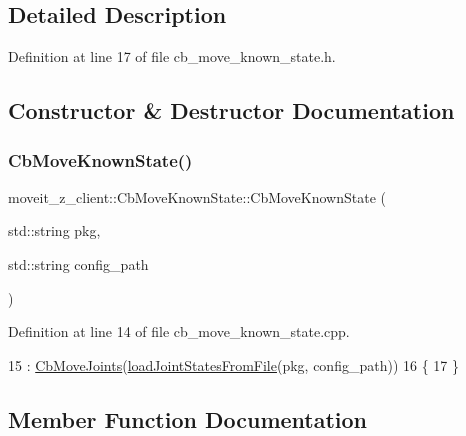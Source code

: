 \subsection{Detailed Description}


Definition at line 17 of file cb\+\_\+move\+\_\+known\+\_\+state.\+h.



\subsection{Constructor \& Destructor Documentation}
\mbox{\label{classmoveit__z__client_1_1CbMoveKnownState_a8840d740bac0275a2ead514bf72f31b2}} 
\subsubsection{\texorpdfstring{Cb\+Move\+Known\+State()}{CbMoveKnownState()}}
{\footnotesize\ttfamily moveit\+\_\+z\+\_\+client\+::\+Cb\+Move\+Known\+State\+::\+Cb\+Move\+Known\+State (\begin{DoxyParamCaption}\item[{std\+::string}]{pkg,  }\item[{std\+::string}]{config\+\_\+path }\end{DoxyParamCaption})}



Definition at line 14 of file cb\+\_\+move\+\_\+known\+\_\+state.\+cpp.


\begin{DoxyCode}
15   : \hyperlink{classmoveit__z__client_1_1CbMoveJoints_a8d9f24fd96baa202c546654f3e92f51c}{CbMoveJoints}(\hyperlink{classmoveit__z__client_1_1CbMoveKnownState_ac5b7069781a33407d56cb19c2811a098}{loadJointStatesFromFile}(pkg, config\_path))
16 \{
17 \}
\end{DoxyCode}


\subsection{Member Function Documentation}
\mbox{\label{classmoveit__z__client_1_1CbMoveKnownState_ac5b7069781a33407d56cb19c2811a098}} 
